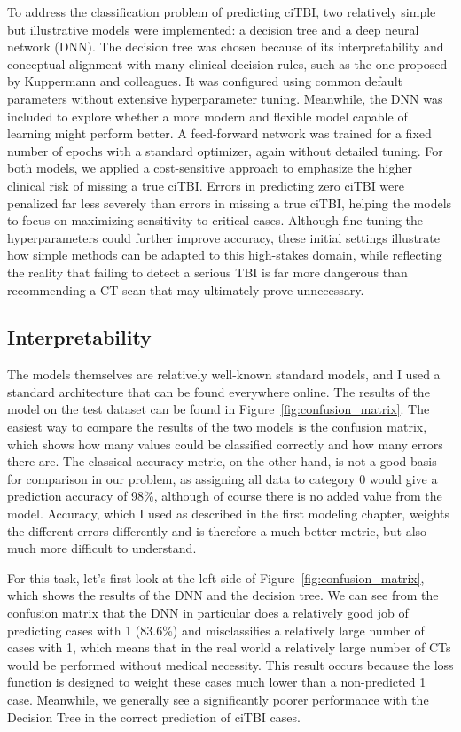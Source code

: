 \documentclass[10pt,letterpaper]{article}
\begin{document}
To address the classification problem of predicting ciTBI, two relatively simple but illustrative models were implemented: a decision tree and a deep neural network (DNN). The decision tree was chosen because of its interpretability and conceptual alignment with many clinical decision rules, such as the one proposed by Kuppermann and colleagues. It was configured using common default parameters without extensive hyperparameter tuning. Meanwhile, the DNN was included to explore whether a more modern and flexible model capable of learning might perform better. A feed-forward network was trained for a fixed number of epochs with a standard optimizer, again without detailed tuning. For both models, we applied a cost-sensitive approach to emphasize the higher clinical risk of missing a true ciTBI. Errors in predicting zero ciTBI were penalized far less severely than errors in missing a true ciTBI, helping the models to focus on maximizing sensitivity to critical cases. Although fine-tuning the hyperparameters could further improve accuracy, these initial settings illustrate how simple methods can be adapted to this high-stakes domain, while reflecting the reality that failing to detect a serious TBI is far more dangerous than recommending a CT scan that may ultimately prove unnecessary.

\subsection{Interpretability}

The models themselves are relatively well-known standard models, and I used a standard architecture that can be found everywhere online. The results of the model on the test dataset can be found in Figure~\ref{fig:confusion_matrix}. The easiest way to compare the results of the two models is the confusion matrix, which shows how many values could be classified correctly and how many errors there are. The classical accuracy metric, on the other hand, is not a good basis for comparison in our problem, as assigning all data to category 0 would give a prediction accuracy of 98\%, although of course there is no added value from the model. Accuracy, which I used as described in the first modeling chapter, weights the different errors differently and is therefore a much better metric, but also much more difficult to understand.

For this task, let's first look at the left side of Figure~\ref{fig:confusion_matrix}, which shows the results of the DNN and the decision tree. We can see from the confusion matrix that the DNN in particular does a relatively good job of predicting cases with 1 (83.6\%) and misclassifies a relatively large number of cases with 1, which means that in the real world a relatively large number of CTs would be performed without medical necessity. This result occurs because the loss function is designed to weight these cases much lower than a non-predicted 1 case. Meanwhile, we generally see a significantly poorer performance with the Decision Tree in the correct prediction of ciTBI cases.
\end{document}
